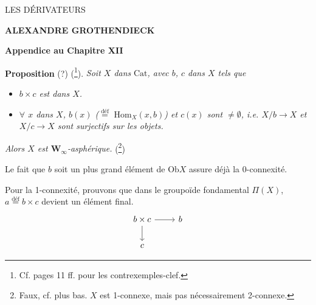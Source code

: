 \documentclass[11pt]{article}
\newcommand{\printedpage}[1]{\marginpar{\footnotesize p.~#1}}
\newcommand{\msp}[1]{\marginpar{\footnotesize [#1]}}
\newcommand{\Hom}{\mathrm{Hom}}
\newcommand{\Ob}{\mathrm{Ob}}
\newcommand{\Cat}{\mathrm{Cat}}
\newcommand{\deq}{\mathrel{\overset{\text{déf}}{=}}}
\begin{document}
\printedpage{}

\begin{center}
{\LARGE\textsf{LES DÉRIVATEURS}}

\bigskip

\textbf{ALEXANDRE GROTHENDIECK}

\bigskip\bigskip

{\large\textbf{Appendice au Chapitre XII}}
\end{center}

\newpage

\printedpage{1}

\msp{page 1}
\textbf{Proposition} (?) (\footnote{Cf. pages 11 ff. pour les contrexemples-clef.}). \textit{Soit $X$ dans} $\Cat$\textit{, avec $b$, $c$ dans $X$ tels que}

\begin{itemize}
\item[\textit{a)}] \textit{$b\times c$ est dans $X$.}
\item[\textit{b)}] \textit{$\forall$ $x$ dans $X$, $b(x)$ ($\deq$} $\Hom_X(x,b)$\textit{) et $c(x)$ sont $\neq\emptyset$, i.e. $X/b \longrightarrow X$ et $X/c \longrightarrow X$ sont surjectifs sur les objets.}
\end{itemize}

\textit{Alors $X$ est $\mathbf{W}_\infty$-asphérique.} (\footnote{Faux, cf. plus bas. $X$ est 1-connexe, mais pas nécessairement 2-connexe.})

Le fait que $b$ soit un plus grand élément de $\Ob X$ assure déjà la 0-connexité.

Pour la 1-connexité, prouvons que dans le groupoïde fondamental $\Pi(X)$, $a \deq b\times c$ devient un élément final.
\[
\begin{tikzcd}
b\times c \arrow[r] \arrow[d] & b \\
c &
\end{tikzcd}
\]
\end{document}
